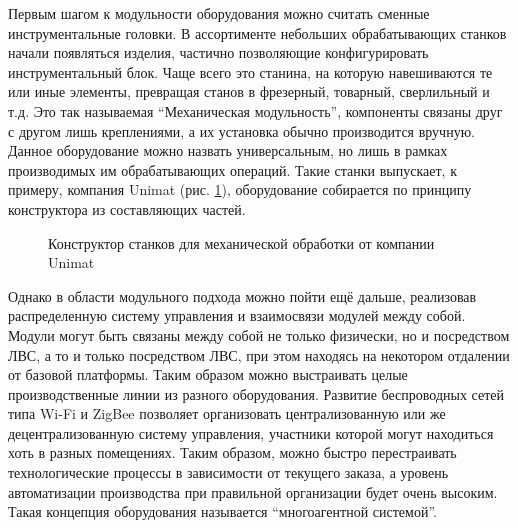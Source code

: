 Первым шагом к модульности оборудования можно считать сменные инструментальные головки. В ассортименте небольших обрабатывающих станков начали появляться изделия, частично позволяющие конфигурировать инструментальный блок. Чаще всего это станина, на которую навешиваются те или иные элементы, превращая станов в фрезерный, товарный, сверлильный и т.д. Это так называемая ``Механическая модульность'', компоненты связаны друг с другом лишь креплениями, а их установка обычно производится вручную. Данное оборудование можно назвать универсальным, но лишь в рамках производимых им обрабатывающих операций. Такие станки выпускает, к примеру, компания Unimat (рис. \cref{fig:unimat_ml_technics}), оборудование собирается по принципу конструктора из составляющих частей.

\begin{figure}[h]
	\caption{Конструктор станков для механической обработки от компании Unimat}\label{fig:unimat_ml_technics}
\end{figure}

Однако в области модульного подхода можно пойти ещё дальше, реализовав распределенную систему управления и взаимосвязи модулей между собой. Модули могут быть связаны между собой не только физически, но и посредством ЛВС, а то и только посредством ЛВС, при этом находясь на некотором отдалении от базовой платформы. Таким образом можно выстраивать целые производственные линии из разного оборудования. Развитие беспроводных сетей типа Wi-Fi и ZigBee позволяет организовать централизованную или же децентрализованную систему управления, участники которой могут находиться хоть в разных помещениях. Таким образом, можно быстро перестраивать технологические процессы в зависимости от текущего заказа, а уровень автоматизации производства при правильной организации будет очень высоким. Такая концепция оборудования называется ``многоагентной системой''.

